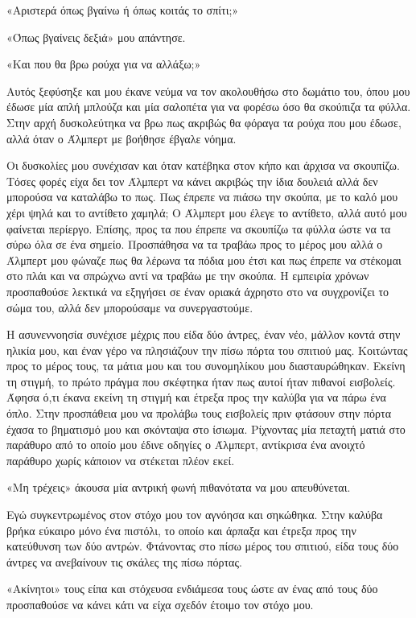 \documentclass[12pt,twoside, openany]{book}
\begin{document}
«Αριστερά όπως βγαίνω ή όπως κοιτάς το σπίτι;»

«Όπως βγαίνεις δεξιά» μου απάντησε.

«Και που θα βρω ρούχα για να αλλάξω;»

Αυτός ξεφύσηξε και μου έκανε νεύμα να τον ακολουθήσω στο δωμάτιο του, όπου μου έδωσε μία απλή μπλούζα και μία σαλοπέτα για να φορέσω όσο θα σκούπιζα τα φύλλα. Στην αρχή δυσκολεύτηκα να βρω πως ακριβώς θα φόραγα τα ρούχα που μου έδωσε, αλλά όταν ο Άλμπερτ με βοήθησε έβγαλε νόημα. 

Οι δυσκολίες μου συνέχισαν και όταν κατέβηκα στον κήπο και άρχισα να σκουπίζω. Τόσες φορές είχα δει τον Άλμπερτ να κάνει ακριβώς την ίδια δουλειά αλλά δεν μπορούσα να καταλάβω το πως. Πως έπρεπε να πιάσω την σκούπα, με το καλό μου χέρι ψηλά και το αντίθετο χαμηλά; Ο Άλμπερτ μου έλεγε το αντίθετο, αλλά αυτό μου φαίνεται περίεργο. Επίσης, προς τα που έπρεπε να σκουπίζω τα φύλλα ώστε να τα σύρω όλα σε ένα σημείο. Προσπάθησα να τα τραβάω προς το μέρος μου αλλά ο Άλμπερτ μου φώναζε πως θα λέρωνα τα πόδια μου έτσι και πως έπρεπε να στέκομαι στο πλάι και να σπρώχνω αντί να τραβάω με την σκούπα. Η εμπειρία χρόνων προσπαθούσε λεκτικά να εξηγήσει σε έναν οριακά άχρηστο στο να συγχρονίζει το σώμα του, αλλά δεν μπορούσαμε να συνεργαστούμε.

Η ασυνεννοησία συνέχισε μέχρις που είδα δύο άντρες, έναν νέο, μάλλον κοντά στην ηλικία μου, και έναν γέρο να πλησιάζουν την πίσω πόρτα του σπιτιού μας. Κοιτώντας προς το μέρος τους, τα μάτια μου και του συνομηλίκου μου διασταυρώθηκαν. Εκείνη τη στιγμή, το πρώτο πράγμα που σκέφτηκα ήταν πως αυτοί ήταν πιθανοί εισβολείς. Άφησα ό,τι έκανα εκείνη τη στιγμή και έτρεξα προς την καλύβα για να πάρω ένα όπλο. Στην προσπάθεια μου να προλάβω τους εισβολείς πριν φτάσουν στην πόρτα έχασα το βηματισμό μου και σκόνταψα στο ίσιωμα. Ρίχνοντας μία πεταχτή ματιά στο παράθυρο από το οποίο μου έδινε οδηγίες ο Άλμπερτ, αντίκρισα ένα ανοιχτό παράθυρο χωρίς κάποιον να στέκεται πλέον εκεί. 

«Μη τρέχεις» άκουσα μία αντρική φωνή πιθανότατα να μου απευθύνεται.

Εγώ συγκεντρωμένος στον στόχο μου τον αγνόησα και σηκώθηκα. Στην καλύβα βρήκα εύκαιρο μόνο ένα πιστόλι, το οποίο και άρπαξα και έτρεξα προς την κατεύθυνση των δύο αντρών. Φτάνοντας στο πίσω μέρος του σπιτιού, είδα τους δύο άντρες να ανεβαίνουν τις σκάλες της πίσω πόρτας.

«Ακίνητοι» τους είπα και στόχευσα ενδιάμεσα τους ώστε αν ένας από τους δύο προσπαθούσε να κάνει κάτι να είχα σχεδόν έτοιμο τον στόχο μου.
\end{document}
